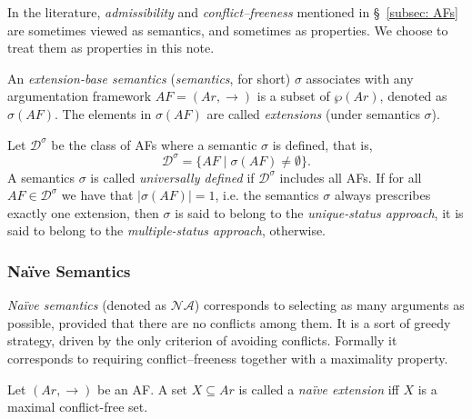 \begin{remark}
    In the literature, 
    \textit{admissibility} and \textit{conflict--freeness} mentioned in \S~\ref{subsec: AFs} are sometimes viewed as semantics, and sometimes as properties.
    We choose to treat them as properties in this note.
\end{remark}




\begin{df}
\label{def: extension-semantics}
    An \textit{extension-base semantics} (\textit{semantics}, for short) $\sigma$ associates with any argumentation framework $AF = (Ar,\to)$ is a subset of $\wp(Ar)$, 
    denoted as $\sigma(AF)$.    
    The elements in $\sigma(AF)$ are called \textit{extensions} (under semantics $\sigma$).


    Let $\mathcal{D}^\sigma$ be the class of AFs where a semantic $\sigma$ is defined, 
    that is, 
    \[
        \mathcal{D}^\sigma 
            = 
        \{AF \mid \sigma(AF)\not=\emptyset\}.
    \]
    A semantics $\sigma$ is called \textit{universally defined} if $\mathcal{D}^\sigma$ includes all AFs.
    If for all $AF \in \mathcal{D}^\sigma$ we have that $|\sigma(AF)| = 1$, 
    i.e. the semantics $\sigma$ always prescribes exactly one extension, 
    then $\sigma$ is said to belong to the \textit{unique-status approach}, 
    it is said to belong to the \textit{multiple-status approach}, 
    otherwise.
\end{df}



\subsubsection{Na\"{i}ve Semantics}


\textit{Na\"{i}ve semantics} (denoted as $\mathcal{N}\!\mathcal{A}$) corresponds to selecting as many arguments as possible, 
provided that there are no conflicts among them.  
% 
It is a sort of greedy strategy, 
driven by the only criterion of avoiding conflicts. 
% 
Formally it corresponds to requiring conflict--freeness together with a maximality property.




\begin{df}[Na\"{i}ve extensions]
    Let $(Ar,\to)$ be an AF. 
    A set $X \subseteq Ar$ is called a \textit{na\"{i}ve extension} iff 
    $X$ is a maximal conflict-free set.
\end{df}


